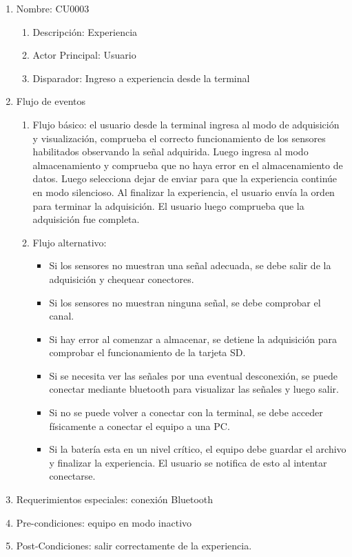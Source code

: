 	\begin{enumerate} 
		\item Nombre: CU0003
		\begin{enumerate} [label*=\arabic*.]
			\item Descripción: Experiencia
			\item Actor Principal: Usuario
			\item Disparador: Ingreso a experiencia desde la terminal
		\end{enumerate}
		\item Flujo de eventos
		\begin{enumerate} [label*=\arabic*.]
			\item Flujo básico: el usuario desde la terminal ingresa al modo de adquisición y visualización, comprueba el correcto funcionamiento de los sensores habilitados observando la señal adquirida. Luego ingresa al modo almacenamiento y comprueba que no haya error en el almacenamiento de datos. Luego selecciona dejar de enviar para que la experiencia continúe en modo silencioso. Al finalizar la experiencia, el usuario envía la orden para terminar la adquisición. El usuario luego comprueba que la adquisición fue completa.
			\item Flujo alternativo:
			\begin{itemize}
				\item Si los sensores no muestran una señal adecuada, se debe salir de la adquisición y chequear conectores.
				\item Si los sensores no muestran ninguna señal, se debe comprobar el canal.
				\item Si hay error al comenzar a almacenar, se detiene la adquisición para comprobar el funcionamiento de la tarjeta SD.
				\item Si se necesita ver las señales por una eventual desconexión, se puede conectar mediante bluetooth para visualizar las señales y luego salir. 
				\item Si no se puede volver a conectar con la terminal, se debe acceder físicamente a conectar el equipo a una PC.
				\item Si la batería esta en un nivel crítico, el equipo debe guardar el archivo y finalizar la experiencia. El usuario se notifica de esto al intentar conectarse.					
			\end{itemize}				
		\end{enumerate}

		\item Requerimientos especiales: conexión Bluetooth
		\item Pre-condiciones: equipo en modo inactivo
		\item Post-Condiciones: salir correctamente de la experiencia.
	\end{enumerate}


